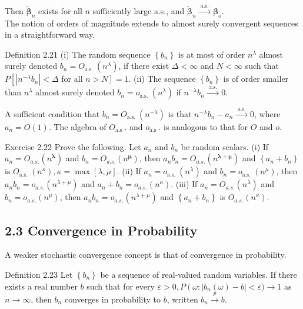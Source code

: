 \documentclass[10pt]{article}
\begin{document}
Then $\tilde{\boldsymbol{\beta}}_{n}$ exists for all $n$ sufficiently large a.s., and $\tilde{\boldsymbol{\beta}}_{n} \xrightarrow{\text { a.s. }} \boldsymbol{\beta}_{o}$.\\
The notion of orders of magnitude extends to almost surely convergent sequences in a straightforward way.

Definition 2.21 (i) The random sequence $\left\{b_{n}\right\}$ is at most of order $n^{\lambda}$ almost surely denoted $b_{n}=O_{\text {a.s. }}\left(n^{\lambda}\right)$, if there exist $\Delta<\infty$ and $N<\infty$ such that $P\left[\left|n^{-\lambda} b_{n}\right|<\Delta\right.$ for all $\left.n>N\right]=1$. (ii) The sequence $\left\{b_{n}\right\}$ is of order smaller than $n^{\lambda}$ almost surely denoted $b_{n}=o_{\text {a.s. }}\left(n^{\lambda}\right)$ if $n^{-\lambda} b_{n} \xrightarrow{\text { a.s. }} 0$.

A sufficient condition that $b_{n}=O_{\text {a.s. }}\left(n^{-\lambda}\right)$ is that $n^{-\lambda} b_{n}-a_{n} \xrightarrow{\text { a.s. }} 0$, where $a_{n}=O(1)$. The algebra of $O_{\text {a.s }}$. and $o_{\text {a.s }}$. is analogous to that for $O$ and $o$.

Exercise 2.22 Prove the following. Let $a_{n}$ and $b_{n}$ be random scalars. (i) If $a_{n}=O_{a . s .}\left(n^{\boldsymbol{\lambda}}\right)$ and $b_{n}=O_{a . s .}\left(n^{\boldsymbol{\mu}}\right)$, then $a_{n} b_{n}=O_{a . s .}\left(n^{\boldsymbol{\lambda}+\boldsymbol{\mu}}\right)$ and $\left\{a_{n}+b_{n}\right\}$ is $O_{\text {a.s. }}\left(n^{\kappa}\right), \kappa=\max [\lambda, \mu]$. (ii) If $a_{n}=o_{\text {a.s. }}\left(n^{\lambda}\right)$ and $b_{n}=o_{\text {a.s. }}\left(n^{\mu}\right)$, then $a_{n} b_{n}=o_{a . s .}\left(n^{\lambda+\mu}\right)$ and $a_{n}+b_{n}=o_{a . s .}\left(n^{\kappa}\right)$. (iii) If $a_{n}=O_{a . s .}\left(n^{\lambda}\right)$ and $b_{n}=o_{a . s .}\left(n^{\mu}\right)$, then $a_{n} b_{n}=o_{a . s .}\left(n^{\lambda+\mu}\right)$ and $\left\{a_{n}+b_{n}\right\}$ is $O_{a . s .}\left(n^{\kappa}\right)$.

\subsection*{2.3 Convergence in Probability}
A weaker stochastic convergence concept is that of convergence in probability.

Definition 2.23 Let $\left\{b_{n}\right\}$ be a sequence of real-valued random variables. If there exists a real number $b$ such that for every $\varepsilon>0, P\left(\omega:\left|b_{n}(\omega)-b\right|<\right. \varepsilon) \rightarrow 1$ as $n \rightarrow \infty$, then $b_{n}$ converges in probability to $b$, written $b_{n} \xrightarrow{p} b$.
\end{document}
